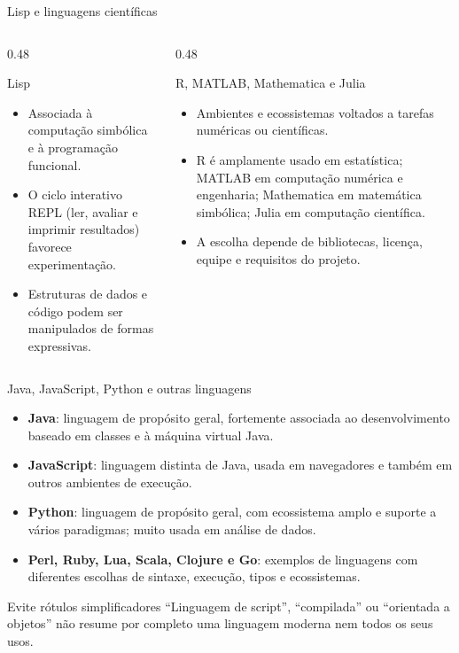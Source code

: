 \documentclass[aspectratio=169,10pt]{beamer}
\begin{document}
\begin{frame}{Lisp e linguagens científicas}
  \begin{columns}[T,onlytextwidth]
    \begin{column}{0.48\textwidth}
      \begin{block}{Lisp}
        \begin{itemize}
          \item Associada à computação simbólica e à programação funcional.
          \item O ciclo interativo REPL (ler, avaliar e imprimir resultados) favorece experimentação.
          \item Estruturas de dados e código podem ser manipulados de formas expressivas.
        \end{itemize}
      \end{block}
    \end{column}
    \begin{column}{0.48\textwidth}
      \begin{exampleblock}{R, MATLAB, Mathematica e Julia}
        \begin{itemize}
          \item Ambientes e ecossistemas voltados a tarefas numéricas ou científicas.
          \item R é amplamente usado em estatística; MATLAB em computação numérica e engenharia; Mathematica em matemática simbólica; Julia em computação científica.
          \item A escolha depende de bibliotecas, licença, equipe e requisitos do projeto.
        \end{itemize}
      \end{exampleblock}
    \end{column}
  \end{columns}
\end{frame}

\begin{frame}{Java, JavaScript, Python e outras linguagens}
  \begin{itemize}
    \item \textbf{Java}: linguagem de propósito geral, fortemente associada ao desenvolvimento baseado em classes e à máquina virtual Java.
    \item \textbf{JavaScript}: linguagem distinta de Java, usada em navegadores e também em outros ambientes de execução.
    \item \textbf{Python}: linguagem de propósito geral, com ecossistema amplo e suporte a vários paradigmas; muito usada em análise de dados.
    \item \textbf{Perl, Ruby, Lua, Scala, Clojure e Go}: exemplos de linguagens com diferentes escolhas de sintaxe, execução, tipos e ecossistemas.
  \end{itemize}
  \begin{alertblock}{Evite rótulos simplificadores}
    “Linguagem de script”, “compilada” ou “orientada a objetos” não resume por completo uma linguagem moderna nem todos os seus usos.
  \end{alertblock}
\end{frame}
\end{document}
